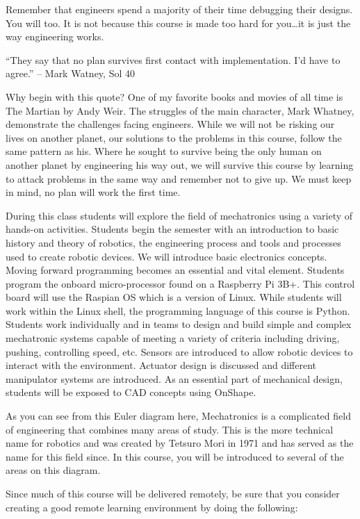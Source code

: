 \documentclass[
]{book}
\begin{document}
Remember that engineers spend a majority of their time debugging their designs. You will too. It is not because this course is made too hard for you\ldots it is just the way engineering works.

``They say that no plan survives first contact with implementation. I'd have to agree.'' -- Mark Watney, Sol 40

Why begin with this quote? One of my favorite books and movies of all time is The Martian by Andy Weir. The struggles of the main character, Mark Whatney, demonstrate the challenges facing engineers. While we will not be risking our lives on another planet, our solutions to the problems in this course, follow the same pattern as his. Where he sought to survive being the only human on another planet by engineering his way out, we will survive this course by learning to attack problems in the same way and remember not to give up. We must keep in mind, no plan will work the first time.

During this class students will explore the field of mechatronics using a variety of hands-on activities. Students begin the semester with an introduction to basic history and theory of robotics, the engineering process and tools and processes used to create robotic devices. We will introduce basic electronics concepts. Moving forward programming becomes an essential and vital element. Students program the onboard micro-processor found on a Raspberry Pi 3B+. This control board will use the Raspian OS which is a version of Linux. While students will work within the Linux shell, the programming language of this course is Python. Students work individually and in teams to design and build simple and complex mechatronic systems capable of meeting a variety of criteria including driving, pushing, controlling speed, etc. Sensors are introduced to allow robotic devices to interact with the environment. Actuator design is discussed and different manipulator systems are introduced. As an essential part of mechanical design, students will be exposed to CAD concepts using OnShape.

As you can see from this Euler diagram here, Mechatronics is a complicated field of engineering that combines many areas of study. This is the more technical name for robotics and was created by Tetsuro Mori in 1971 and has served as the name for this field since. In this course, you will be introduced to several of the areas on this diagram.

Since much of this course will be delivered remotely, be sure that you consider creating a good remote learning environment by doing the following:
\end{document}
